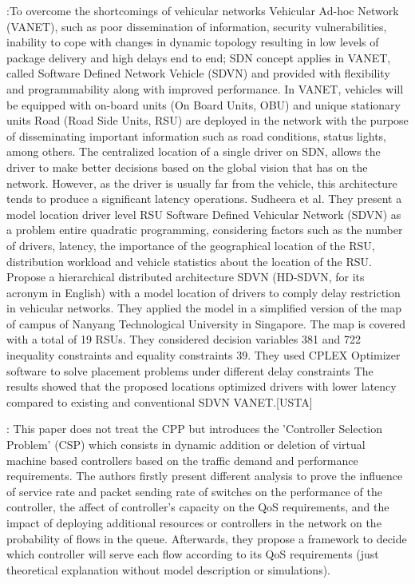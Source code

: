 \documentclass[a4paper,10pt]{article}
\begin{document}
\cite{SuMa18}:To overcome the shortcomings of vehicular networks Vehicular Ad-hoc Network (VANET), such as poor dissemination of information, security vulnerabilities, inability to cope with changes in dynamic topology resulting in low levels of package delivery and high delays end to end; SDN concept applies in VANET, called Software Defined Network Vehicle (SDVN) and provided with flexibility and programmability along with improved performance. In VANET, vehicles will be equipped with on-board units (On Board Units, OBU) and unique stationary units Road (Road Side Units, RSU) are deployed in the network with the purpose of disseminating important information such as road conditions, status lights, among others. The centralized location of a single driver on SDN, allows the driver to make better decisions based on the global vision that has on the network. However, as the driver is usually far from the vehicle, this architecture tends to produce a significant latency operations.
Sudheera et al. They present a model location driver level RSU Software Defined Vehicular Network (SDVN) as a problem entire quadratic programming, considering factors such as the number of drivers, latency, the importance of the geographical location of the RSU, distribution workload and vehicle statistics about the location of the RSU. Propose a hierarchical distributed architecture SDVN (HD-SDVN, for its acronym in English) with a model location of drivers to comply delay restriction in vehicular networks.
They applied the model in a simplified version of the map of campus of Nanyang Technological University in Singapore. The map is covered with a total of 19 RSUs. They considered decision variables 381 and 722 inequality constraints and equality constraints 39. They used CPLEX Optimizer software to solve placement problems under different delay constraints
The results showed that the proposed locations optimized drivers with lower latency compared to existing and conventional SDVN VANET.[USTA]

%
%
%
%

\cite{SoXi17}: This paper does not treat the CPP but introduces the 'Controller Selection Problem' (CSP) which consists in dynamic addition or deletion of virtual machine based controllers based on the traffic demand and performance requirements. The authors firstly present different analysis to prove the influence of service rate and packet sending rate of switches on the performance of the controller, the affect of controller's capacity on the QoS requirements, and the impact of deploying additional resources or controllers in the network on the probability of flows in the queue. Afterwards, they propose a framework to decide which controller will serve each flow according to its QoS requirements (just theoretical explanation without model description or simulations). 
\end{document}
